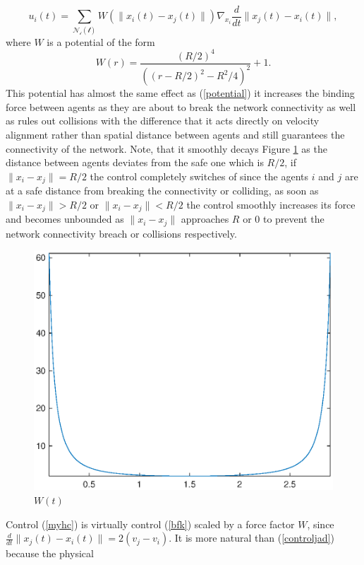 \documentclass[a4paper,10pt, english]{article}
\begin{document}
\begin{equation}
u_i(t) = \sum_{\mathcal{N_{i}(t)}}W(\|x_i(t) - x_j(t)\|) \nabla_{x_i} \frac{d}{dt}\|x_j(t) - x_i(t)\|,
\label{myhc}
\end{equation}
where $W$ is a potential of the form
\begin{equation}
 W(r) = \frac{(R/2)^4}{((r - R/2)^2  - R^2/4)^2} + 1.
\label{potentialw}
\end{equation}
This potential has almost the same effect as (\ref{potential}) it increases the binding force between agents as they are about to break the network connectivity as well as rules out collisions with the difference that it acts directly on velocity alignment rather than spatial distance between agents and still guarantees the connectivity of the network. Note, that it smoothly decays Figure \ref{potentialwplot} as the distance between agents deviates from the safe one which is $R/2$, if $\|x_i - x_j\| = R/2$ the control completely switches of since the agents $i$ and $j$ are at a safe distance from breaking the connectivity or colliding, 
as soon as  $\|x_i - x_j\| > R/2$ or $\|x_i - x_j\| < R/2$ the control smoothly increases its force and becomes unbounded as $\|x_i - x_j\|$ approaches $R$ or $0$ to prevent the network connectivity breach or collisions respectively. 
\begin{figure}[ht]
 \centering
 \includegraphics[scale=0.5]{figures/potentialwplot.eps}
 \caption{$W(t)$}
 \label{potentialwplot}
\end{figure}
Control (\ref{myhc}) is virtually control (\ref{bfk})  scaled by a force factor $W$, since $\frac{d}{dt}\|x_j(t) - x_i(t)\| = 2(v_j - v_i)$. It is more natural than (\ref{controljad}) because the physical 
\end{document}
